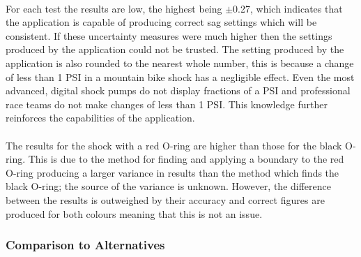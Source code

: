 			\\
			For each test the results are low, the highest being $\pm$0.27, which indicates that the application is capable of producing correct sag settings which will be consistent. If these uncertainty measures were much higher then the settings produced by the application could not be trusted. The setting produced by the application is also rounded to the nearest whole number, this is because a change of less than 1 PSI in a mountain bike shock has a negligible effect. Even the most advanced, digital shock pumps do not display fractions of a PSI and professional race teams do not make changes of less than 1 PSI. This knowledge further reinforces the capabilities of the application.
			\\\\
			The results for the shock with a red O-ring are higher than those for the black O-ring. This is due to the method for finding and applying a boundary to the red O-ring producing a larger variance in results than the method which finds the black O-ring; the source of the variance is unknown. However, the difference between the results is outweighed by their accuracy and correct figures are produced for both colours meaning that this is not an issue.
		\subsubsection{Comparison to Alternatives}
